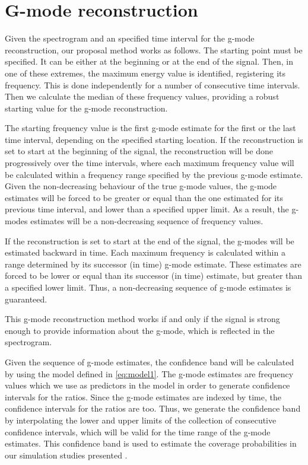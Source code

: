 \section{G-mode reconstruction}
\label{app:gmode}
Given the spectrogram and an specified time interval for the g-mode reconstruction, our proposal method works as follows.  The starting point must be specified.  It can be either at the beginning or at the end of the signal.  Then, in one of these extremes, the maximum energy value is identified, registering its frequency.  This is done independently for a number of consecutive time intervals.  Then we calculate the median of these frequency values, providing a robust starting value for the g-mode reconstruction.

The starting frequency value is the first g-mode estimate for the first or the last time interval, depending on the specified starting location.  If the reconstruction is set to start at the beginning of the signal, the reconstruction will be done progressively over the time intervals, where each maximum frequency value will be calculated within a frequency range specified by the previous g-mode estimate.  Given the non-decreasing behaviour of the true g-mode values, the g-mode estimates will be forced to be greater or equal than the one estimated for its previous time interval, and lower than a specified upper limit.  As a result, the g-modes estimates will be a non-decreasing sequence of frequency values. 

If the reconstruction is set to start at the end of the signal, the g-modes will be estimated backward in time.  Each maximum frequency is calculated within a range determined by its successor (in time) g-mode estimate.  These estimates are forced to be lower or equal than its successor (in time) estimate, but greater than a specified lower limit. Thus, a non-decreasing sequence of g-mode estimates is guaranteed.

This g-mode reconstruction method works if and only if the signal is strong enough to provide information about the g-mode, which is reflected in the spectrogram.


Given the sequence of g-mode estimates, the confidence band will be calculated by using the model defined in \eqref{eq:model1}. The g-mode estimates are frequency values which we use as predictors in the model in order to generate confidence intervals for the ratios. Since the g-mode estimates are indexed by time, the confidence intervals for the ratios are too.  Thus, we generate the confidence band by interpolating the lower and upper limits of the collection of consecutive confidence intervals, which will be valid for the time range of the g-mode estimates.  This confidence band is used to estimate the coverage probabilities in our simulation studies presented .  
